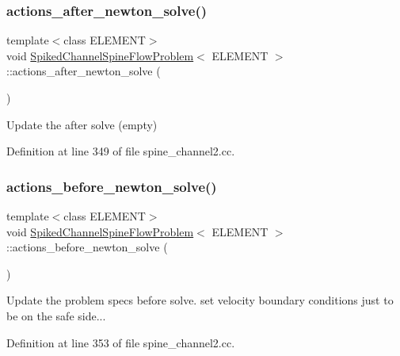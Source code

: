 \subsubsection{\texorpdfstring{actions\+\_\+after\+\_\+newton\+\_\+solve()}{actions\_after\_newton\_solve()}}
{\footnotesize\ttfamily template$<$class E\+L\+E\+M\+E\+NT$>$ \\
void \hyperlink{classSpikedChannelSpineFlowProblem}{Spiked\+Channel\+Spine\+Flow\+Problem}$<$ E\+L\+E\+M\+E\+NT $>$\+::actions\+\_\+after\+\_\+newton\+\_\+solve (\begin{DoxyParamCaption}{ }\end{DoxyParamCaption})\hspace{0.3cm}{\ttfamily [inline]}}



Update the after solve (empty) 



Definition at line 349 of file spine\+\_\+channel2.\+cc.

\mbox{\label{classSpikedChannelSpineFlowProblem_a98e464ea1ab1c14d703415d63e89115e}} 
\subsubsection{\texorpdfstring{actions\+\_\+before\+\_\+newton\+\_\+solve()}{actions\_before\_newton\_solve()}}
{\footnotesize\ttfamily template$<$class E\+L\+E\+M\+E\+NT$>$ \\
void \hyperlink{classSpikedChannelSpineFlowProblem}{Spiked\+Channel\+Spine\+Flow\+Problem}$<$ E\+L\+E\+M\+E\+NT $>$\+::actions\+\_\+before\+\_\+newton\+\_\+solve (\begin{DoxyParamCaption}{ }\end{DoxyParamCaption})\hspace{0.3cm}{\ttfamily [inline]}}



Update the problem specs before solve. set velocity boundary conditions just to be on the safe side... 



Definition at line 353 of file spine\+\_\+channel2.\+cc.

